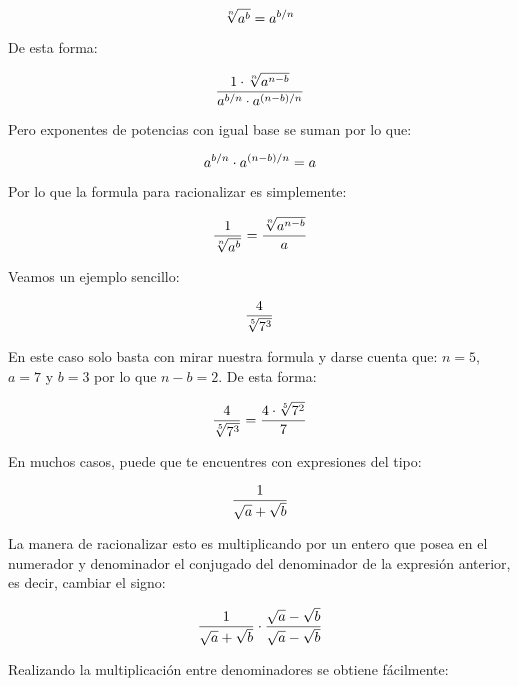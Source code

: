 \begin{equation}
    \notag
   \sqrt[n]{a^b} = a^{b/n}
\end{equation}

De esta forma: 

\begin{equation}
    \notag
    \frac{1\cdot \sqrt[n]{a^{n-b}} }{a^{b/n} \cdot  a^{(n-b)/n}} 
\end{equation}

Pero exponentes de potencias con igual base se suman por lo que:

\begin{equation}
    \notag
   a^{b/n} \cdot  a^{(n-b)/n}= a 
\end{equation}

Por lo que la formula para racionalizar es simplemente: 

\begin{equation}
    \notag
    \frac{1}{\sqrt[n]{a^b}} = \frac{\sqrt[n]{a^{n-b}}}{a}
\end{equation}

Veamos un ejemplo sencillo:


\begin{equation}
    \notag
    \frac{4}{\sqrt[5]{7^3}} 
\end{equation}

En este caso solo basta con mirar nuestra formula y darse cuenta que: $n=5$, $a=7$ y $b=3$ por lo que $n-b=2$. De esta forma:

\begin{equation}
    \notag
    \frac{4}{\sqrt[5]{7^3}} = \frac{4\cdot \sqrt[5]{7^{2}}}{7}
\end{equation}

En muchos casos, puede que te encuentres con expresiones del tipo:

\begin{equation}
    \notag
    \frac{1}{\sqrt{a}+\sqrt{b}}
\end{equation}

La manera de racionalizar esto es multiplicando por un entero que posea en el numerador y denominador el conjugado del denominador de la expresión anterior, es decir, cambiar el signo:

\begin{equation}
    \notag
    \frac{1}{\sqrt{a}+\sqrt{b}}\cdot \frac{\sqrt{a}-\sqrt{b}}{\sqrt{a}-\sqrt{b}}
\end{equation}

Realizando la multiplicación entre denominadores se obtiene fácilmente:

